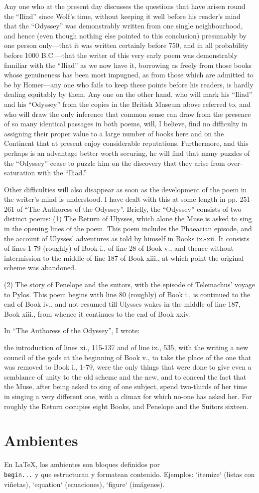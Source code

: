 \documentclass[12pt,letter]{article}
\begin{document}
Any one who at the present day discusses the questions that have arisen
round the “Iliad” since Wolf’s time, without keeping it well before his
reader’s mind that the “Odyssey” was demonstrably written from one
single neighbourhood, and hence (even though nothing else pointed to
this conclusion) presumably by one person only—that it was written
certainly before 750, and in all probability before 1000 B.C.—that the
writer of this very early poem was demonstrably familiar with the
“Iliad” as we now have it, borrowing as freely from those books whose
genuineness has been most impugned, as from those which are admitted to
be by Homer—any one who fails to keep these points before his readers,
is hardly dealing equitably by them. Any one on the other hand, who
will mark his “Iliad” and his “Odyssey” from the copies in the British
Museum above referred to, and who will draw the only inference that
common sense can draw from the presence of so many identical passages
in both poems, will, I believe, find no difficulty in assigning their
proper value to a large number of books here and on the Continent that
at present enjoy considerable reputations. Furthermore, and this
perhaps is an advantage better worth securing, he will find that many
puzzles of the “Odyssey” cease to puzzle him on the discovery that they
arise from over-saturation with the “Iliad.”

Other difficulties will also disappear as soon as the development of
the poem in the writer’s mind is understood. I have dealt with this at
some length in pp. 251-261 of “The Authoress of the Odyssey”. Briefly,
the “Odyssey” consists of two distinct poems: (1) The Return of
Ulysses, which alone the Muse is asked to sing in the opening lines of
the poem. This poem includes the Phaeacian episode, and the account of
Ulysses’ adventures as told by himself in Books ix.-xii. It consists of
lines 1-79 (roughly) of Book i., of line 28 of Book v., and thence
without intermission to the middle of line 187 of Book xiii., at which
point the original scheme was abandoned.

(2) The story of Penelope and the suitors, with the episode of
Telemachus’ voyage to Pylos. This poem begins with line 80 (roughly) of
Book i., is continued to the end of Book iv., and not resumed till
Ulysses wakes in the middle of line 187, Book xiii., from whence it
continues to the end of Book xxiv.

In “The Authoress of the Odyssey”, I wrote:

the introduction of lines xi., 115-137 and of line ix., 535, with the
writing a new council of the gods at the beginning of Book v., to take
the place of the one that was removed to Book i., 1-79, were the only
things that were done to give even a semblance of unity to the old
scheme and the new, and to conceal the fact that the Muse, after being
asked to sing of one subject, spend two-thirds of her time in singing a
very different one, with a climax for which no-one has asked her. For
roughly the Return occupies eight Books, and Penelope and the Suitors
sixteen.

\section[ambs]{Ambientes}

En LaTeX, los ambientes son bloques definidos por \texttt{\\begin{...}} y
 que estructuran y formatean contenido. Ejemplos: `itemize`
(listas con viñetas), `equation` (ecuaciones), `figure` (imágenes).
\end{document}
